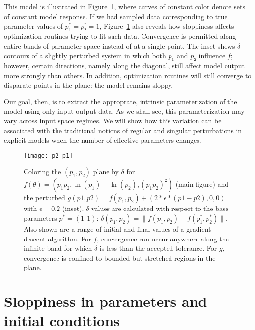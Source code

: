 This model is illustrated in Figure~\ref{fig:non-id}, where curves of
constant color denote sets of constant model response. If we had
sampled data corresponding to true parameter values of
$p_1^* = p_2^* = 1$, Figure~\ref{fig:non-id} also reveals how
sloppiness affects optimization routines trying to fit such
data. Convergence is permitted along entire bands of parameter space
instead of at a single point. The inset shows $\delta$-contours of a
slightly perturbed system in which both $p_1$ and $p_2$ influence $f$;
however, certain directions, namely along the diagonal, still affect
model output more strongly than others. In addition, optimization
routines will still converge to disparate points in the plane: the
model remains sloppy. 

Our goal, then, is to extract the approprate, intrinsic
parameterization of the model using only input-output data. As we
shall see, this parameterization may vary across input space regimes.
We will show how this variation can be associated with the traditional
notions of regular and singular perturbations in explicit models when
the number of effective parameters changes.


\begin{figure}
  \centerline{\texttt{[image: p2-p1]}}
  \caption[Illustration of effects of sloppiness on
  optimization]{Coloring the $(p_1, p_2)$ plane by $\delta$ for
    $f(\theta) = (p_1 p_2 , \ln(p_1) + \ln(p_2) , (p_1 p_2)^2)$ (main
    figure) and the perturbed $g(p1, p2) = f(p_1, p_2) +
    \left(2*\epsilon*(p1 - p2), 0, 0\right)$ with $\epsilon = 0.2$
    (inset). $\delta$ values are calculated with respect to the base
    parameters $p^* = (1, 1)$: $\delta(p_1, p_2) = \| f(p_1, p_2) -
    f(p_1^*, p_2^*)\|$. Also shown are a range of initial and final values of
    a gradient descent algorithm. For $f$, convergence can occur
    anywhere along the infinite band for which $\delta$ is less than
    the accepted tolerance. For $g$, convergence is confined to
    bounded but stretched regions in the plane.
    \label{fig:non-id} }
\end{figure}


\section{Sloppiness in parameters and initial conditions}

